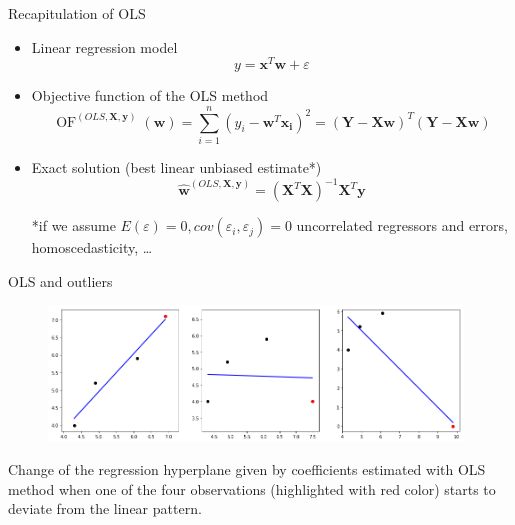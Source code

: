 \documentclass{beamer}
\DeclareMathOperator{\of}{OF}
\let\vec\boldsymbol
\begin{document}
\begin{frame}{Recapitulation of OLS}

  \begin{itemize}
  \item Linear regression model
  \begin{equation*}
          y = \vec{x}^T\vec{w} + \varepsilon
  \end{equation*}
  \item Objective function of the OLS method
  \begin{equation*}
          \of^{(OLS,\vec{X}, \vec{y})}(\vec{w}) = \sum\limits_{i=1}^n (y_i - \vec{w}^T\vec{x_i})^2 = (\vec{Y} - \vec{X}\vec{w})^T(\vec{Y} - \vec{X}\vec{w})
  \end{equation*}
  \item Exact solution (best linear unbiased estimate*)
  \begin{equation*}
      \vec{\hat{w}}^{(OLS,\vec{X}, \vec{y})} = (\vec{X}^T\vec{X})^{-1}\vec{X}^T\vec{y}
  \end{equation*}
  \vskip 1cm
  \begin{block}{*if we assume}
   $ E(\varepsilon) = 0,  cov(\varepsilon_i, \varepsilon_j) = 0$ uncorrelated regressors and errors, homoscedasticity, \dots
  \end{block}
  \end{itemize}
  \end{frame}
  
  
\begin{frame}{OLS and outliers}
  
  \begin{figure}[h]
      \centering
      \includegraphics[width=11cm]{outlier_regression}
  \end{figure}
  Change of the regression hyperplane given by coefficients estimated with OLS method when one of the four observations (highlighted with red color) starts to deviate from the linear pattern.
\end{frame}
\end{document}
